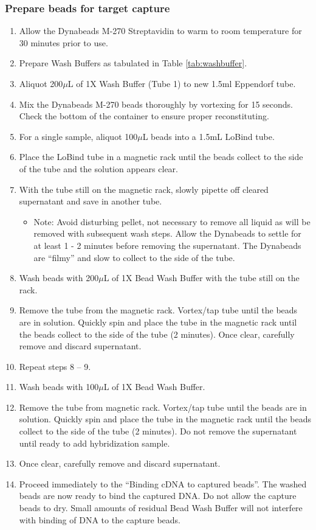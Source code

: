 \subsubsection{Prepare beads for target capture}
\begin{enumerate}
	\item Allow the Dynabeads M-270 Streptavidin to warm to room temperature for 30 minutes prior to use.
	\item Prepare Wash Buffers as tabulated in Table \cref{tab:washbuffer}.	
	\item Aliquot 200$\mu$L of 1X Wash Buffer (Tube 1) to new 1.5ml Eppendorf tube. 
	\item Mix the Dynabeads M-270 beads thoroughly by vortexing for 15 seconds. Check the bottom of the container to ensure proper reconstituting. 
	\item For a single sample, aliquot 100$\mu$L beads into a 1.5mL LoBind tube.
	\item Place the LoBind tube in a magnetic rack until the beads collect to the side of the tube and the solution appears clear. 
	\item With the tube still on the magnetic rack, slowly pipette off cleared supernatant and save in another tube. 
	\begin{itemize}
		\item Note: Avoid disturbing pellet, not necessary to remove all liquid as will be removed with subsequent wash steps. Allow the Dynabeads to settle for at least 1 - 2 minutes before removing the supernatant. The Dynabeads are “filmy” and slow to collect to the side of the tube.
	\end{itemize}
	\item Wash beads with 200$\mu$L of 1X Bead Wash Buffer with the tube still on the rack.
	\item Remove the tube from the magnetic rack. Vortex/tap tube until the beads are in solution. Quickly spin and place the tube in the magnetic rack until the beads collect to the side of the tube (2 minutes). Once clear, carefully remove and discard supernatant.
	\item Repeat steps 8 – 9.
	\item Wash beads with 100$\mu$L of 1X Bead Wash Buffer.
	\item Remove the tube from magnetic rack. Vortex/tap tube until the beads are in solution. Quickly spin and place the tube in the magnetic rack until the beads collect to the side of the tube (2 minutes). 
	Do not remove the supernatant until ready to add hybridization sample.
	\item Once clear, carefully remove and discard supernatant.
	\item Proceed immediately to the “Binding cDNA to captured beads”. The washed beads are now ready to bind the captured DNA. Do not allow the capture beads to dry. Small amounts of residual Bead Wash Buffer will not interfere with binding of DNA to the capture beads.
\end{enumerate} 

